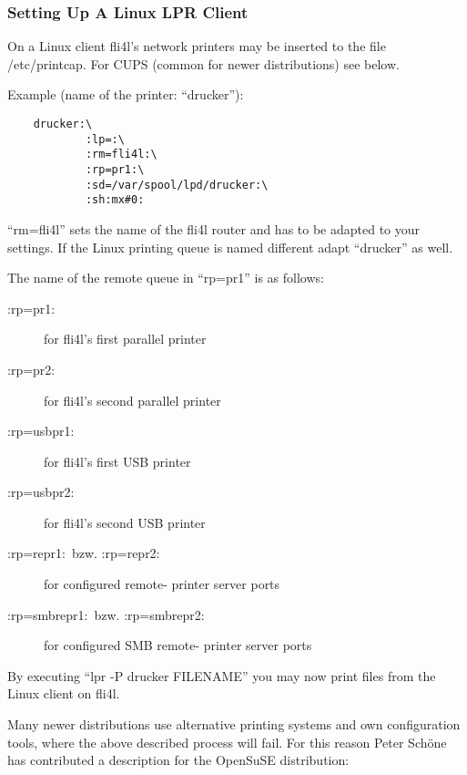 \subsubsection{Setting Up A Linux LPR Client}

  On a Linux client fli4l's network printers may be inserted to the file
  /etc/printcap. For CUPS (common for newer distributions) see below.

  Example (name of the printer: ``drucker''):

\begin{example}
\begin{verbatim}
    drucker:\
            :lp=:\
            :rm=fli4l:\
            :rp=pr1:\
            :sd=/var/spool/lpd/drucker:\
            :sh:mx#0:
\end{verbatim}
\end{example}

  ``rm=fli4l'' sets the name of the fli4l router and has to be adapted
  to your settings. If the Linux printing queue is named different
  adapt ``drucker'' as well.

  The name of the remote queue in ``rp=pr1'' is as follows:

  \begin{description}
  \item[:rp=pr1:\ ] for fli4l's first parallel printer
  \item[:rp=pr2:\ ] for fli4l's second parallel printer

  \item[:rp=usbpr1:\ ] for fli4l's first USB printer
  \item[:rp=usbpr2:\ ] for fli4l's second USB printer

  \item[:rp=repr1:\ bzw. :rp=repr2:\ ] for configured remote-
  printer server ports

  \item[:rp=smbrepr1:\ bzw. :rp=smbrepr2:\ ] for configured SMB remote-
  printer server ports
  \end{description}


  By executing ``lpr -P drucker FILENAME'' you may now print
  files from the Linux client on fli4l.

  Many newer distributions use alternative printing systems and own
  configuration tools, where the above described process will fail.
  For this reason Peter Schöne has contributed a description for the
  OpenSuSE distribution:

